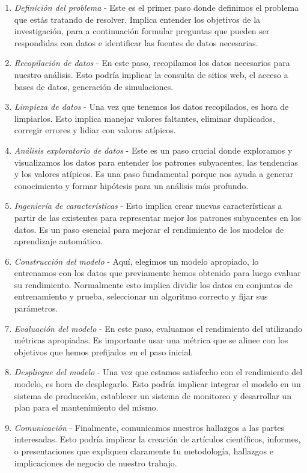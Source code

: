 \begin{enumerate}
	\item \textit{Definición del problema} - Este es el primer paso donde definimos el problema que estás tratando de resolver. Implica entender los objetivos de la investigación, para a continuación formular preguntas que pueden ser respondidas con datos e identificar las fuentes de datos necesarias.
	\item \textit{Recopilación de datos} - En este paso, recopilamos los datos necesarios para nuestro análisis. Esto podría implicar la consulta de sitios web, el acceso a bases de datos, generación de simulaciones.
	\item \textit{Limpieza de datos} - Una vez que tenemos los datos recopilados, es hora de limpiarlos. Esto implica manejar valores faltantes, eliminar duplicados, corregir errores y lidiar con valores atípicos.
	\item \textit{Análisis exploratorio de datos} - Este es un paso crucial donde exploramos y visualizamos los datos para entender los patrones subyacentes, las tendencias y los valores atípicos. Es una paso fundamental porque nos ayuda a generar conocimiento y formar hipótesis para un análisis más profundo.
	\item \textit{Ingeniería de características} - Esto implica crear nuevas características a partir de las existentes para representar mejor los patrones subyacentes en los datos. Es un paso esencial para mejorar el rendimiento de los modelos de aprendizaje automático. 
	\item \textit{Construcción del modelo} - Aquí, elegimos un modelo apropiado, lo entrenamos con los datos que previamente hemos obtenido para luego evaluar su rendimiento. Normalmente esto implica dividir los datos en conjuntos de entrenamiento y prueba, seleccionar un algoritmo correcto y fijar sus parámetros.
	\item \textit{Evaluación del modelo} - En este paso, evaluamos el rendimiento del utilizando métricas apropiadas. Es importante usar una métrica que se alinee con los objetivos que hemos prefijados en el paso inicial.
	\item \textit{Despliegue del modelo} - Una vez que estamos satisfecho con el rendimiento del modelo, es hora de desplegarlo. Esto podría implicar integrar el modelo en un sistema de producción, establecer un sistema de monitoreo y desarrollar un plan para el mantenimiento del mismo.
	\item \textit{Comunicación} - Finalmente, comunicamos nuestros hallazgos a las partes interesadas. Esto podría implicar la creación de artículos científicos, informes, o presentaciones que expliquen claramente tu metodología, hallazgos e implicaciones de negocio de nuestro trabajo.
\end{enumerate}

